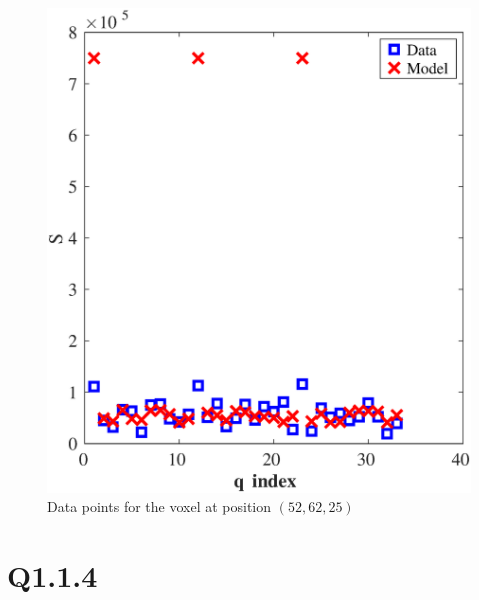 \documentclass[11pt,a4paper,oneside]{report}
\begin{document}
\begin{figure}[H]
\centering
\includegraphics[scale=0.5]{figures/q1/q111.eps}
\caption{Data points for the voxel at position $(52,62,25)$}
\label{q111}
\end{figure}

\section*{Q1.1.4}
\end{document}
